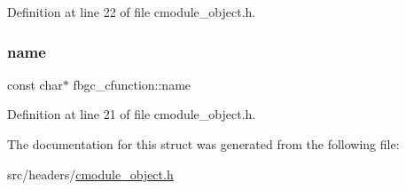 Definition at line 22 of file cmodule\+\_\+object.\+h.

\mbox{\label{structfbgc__cfunction_a6d7ed4017e44902c177a400900cc0844}} 
\subsubsection{\texorpdfstring{name}{name}}
{\footnotesize\ttfamily const char$\ast$ fbgc\+\_\+cfunction\+::name}



Definition at line 21 of file cmodule\+\_\+object.\+h.



The documentation for this struct was generated from the following file\+:\begin{DoxyCompactItemize}
\item 
src/headers/\hyperlink{cmodule__object_8h}{cmodule\+\_\+object.\+h}\end{DoxyCompactItemize}
